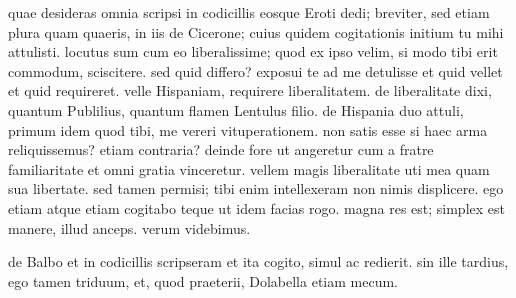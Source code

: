 


 quae desideras omnia scripsi in codicillis eosque Eroti dedi; breviter, sed etiam plura quam quaeris, in iis de Cicerone; cuius quidem cogitationis initium tu mihi attulisti. locutus sum cum eo liberalissime; quod ex ipso velim, si modo tibi erit commodum, sciscitere. sed quid differo? exposui te ad me detulisse et quid vellet et quid requireret. velle Hispaniam, requirere liberalitatem. de liberalitate dixi, quantum Publilius, quantum flamen Lentulus filio. de Hispania duo attuli, primum idem quod tibi, me vereri vituperationem. non satis esse si haec arma reliquissemus? etiam contraria? deinde fore ut angeretur cum a fratre familiaritate et omni gratia vinceretur. vellem magis liberalitate uti mea quam sua libertate. sed tamen permisi; tibi enim intellexeram non nimis displicere. ego etiam atque etiam cogitabo teque ut idem facias rogo. magna res est; simplex est manere, illud anceps. verum videbimus.

 de Balbo et in codicillis scripseram et ita cogito, simul ac redierit. sin ille tardius, ego tamen triduum, et, quod praeterii, Dolabella etiam mecum.
